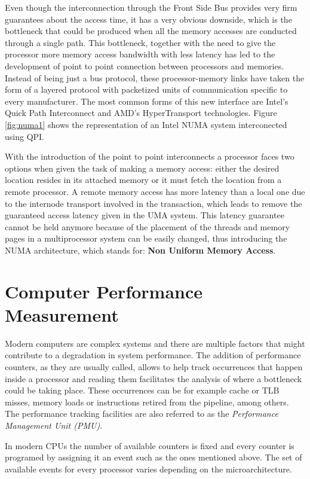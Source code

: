Even though the interconnection through the Front Side Bus provides very firm guarantees about the access time, it has a very obvious downside, which is the bottleneck that could be produced when all the memory accesses are conducted through a single path. This bottleneck, together with the need to give the processor more memory access bandwidth with less latency has led to the development of point to point connection between processors and memories. Instead of being just a bus protocol, these processor-memory links have taken the form of a layered protocol with packetized units of communication specific to every manufacturer. The most common forms of this new interface are Intel's Quick Path Interconnect and AMD's HyperTransport technologies. Figure \ref{fig:numa1} shows the representation of an Intel NUMA system interconected using QPI.

With the introduction of the point to point interconnects a processor faces two options when given the task of making a memory access: either the desired location resides in its attached memory or it must fetch the location from a remote processor. A remote memory access has more latency than a local one due to the internode transport involved in the transaction, which leads to remove the guaranteed access latency given in the UMA system. This latency guarantee cannot be held anymore because of the placement of the threads and memory pages in a multiprocessor system can be easily changed, thus introducing the NUMA architecture, which stands for: \textbf{Non Uniform Memory Access}. 

\section{Computer Performance Measurement}\label{section:perfmeas}

Modern computers are complex systems and there are multiple factors that might contribute to a degradation in system performance. The addition of performance counters, as they are usually called, allows to help track occurrences that happen inside a processor and reading them facilitates the analysis of where a bottleneck could be taking place. These occurrences can be for example cache or TLB misses, memory loads or instructions retired from the pipeline, among others. The performance tracking facilities are also referred to as the \textit{Performance Management Unit (PMU)}.

In modern CPUs the number of available counters is fixed and every counter is programed by assigning it an event such as the ones mentioned above. The set of available events for every processor varies depending on the microarchitecture. 

